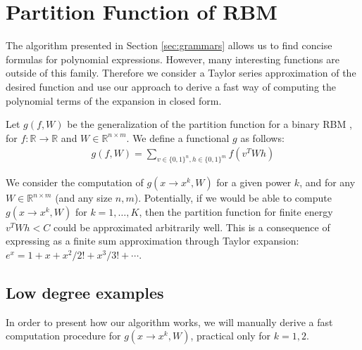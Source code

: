 \section{Partition Function of RBM} \label{partitionfunction}

The algorithm presented in Section
\ref{sec:grammars} allows us to find concise formulas for polynomial expressions.
However, many interesting functions are outside of this
family. Therefore we consider a Taylor series approximation of the desired function
and use our approach to derive a fast way of computing the polynomial
terms of the expansion in closed form.

Let $g(f, W)$ be the generalization of the partition function for a binary
RBM \cite{hinton2002training}, for $f: \mathbb{R} \rightarrow \mathbb{R}$ and $W \in \mathbb{R}^{n \times m}$.
We define a functional $g$ as follows: \\
\begin{gather*}
g(f, W) = \sum_{v \in \{0, 1\}^n, h \in \{0, 1\}^m} f(v^TWh)
\end{gather*}

We consider the computation of $g(x \rightarrow x^k, W)$ for a given power
$k$, and for any $W
\in \mathbb{R}^{n \times m}$ (and any size $n, m$). Potentially, if we would be able
to compute $g(x \rightarrow x^k, W)$ for $k = 1, \dots, K$, then the partition
function for finite energy $v^TWh < C$ could be approximated arbitrarily well.
This is a consequence of expressing as a finite sum approximation through
Taylor expansion: $e^{x}=1+x+x^2/2!+x^3/3!+\cdots$.

\subsection{Low degree examples} In order to present how our algorithm works,
we will manually derive a fast computation procedure for $g(x
\rightarrow x^k, W)$, practical only for $k = 1, 2$. 


